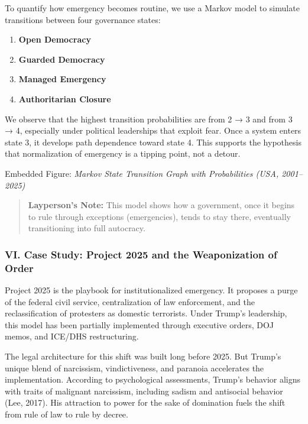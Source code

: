 To quantify how emergency becomes routine, we use a Markov model to
simulate transitions between four governance states:

\begin{enumerate}
\def\labelenumi{\arabic{enumi}.}
\tightlist
\item
  \textbf{Open Democracy}
\item
  \textbf{Guarded Democracy}
\item
  \textbf{Managed Emergency}
\item
  \textbf{Authoritarian Closure}
\end{enumerate}

We observe that the highest transition probabilities are from 2 → 3 and
from 3 → 4, especially under political leaderships that exploit fear.
Once a system enters state 3, it develops path dependence toward state
4. This supports the hypothesis that normalization of emergency is a
tipping point, not a detour.

Embedded Figure: \emph{Markov State Transition Graph with Probabilities
(USA, 2001--2025)}

\begin{quote}
\textbf{Layperson's Note:} This model shows how a government, once it
begins to rule through exceptions (emergencies), tends to stay there,
eventually transitioning into full autocracy.
\end{quote}

\subsubsection{VI. Case Study: Project 2025 and the Weaponization of
Order}\label{vi.-case-study-project-2025-and-the-weaponization-of-order}

Project 2025 is the playbook for institutionalized emergency. It
proposes a purge of the federal civil service, centralization of law
enforcement, and the reclassification of protesters as domestic
terrorists. Under Trump's leadership, this model has been partially
implemented through executive orders, DOJ memos, and ICE/DHS
restructuring.

The legal architecture for this shift was built long before 2025. But
Trump's unique blend of narcissism, vindictiveness, and paranoia
accelerates the implementation. According to psychological assessments,
Trump's behavior aligns with traits of malignant narcissism, including
sadism and antisocial behavior (Lee, 2017). His attraction to power for
the sake of domination fuels the shift from rule of law to rule by
decree.

